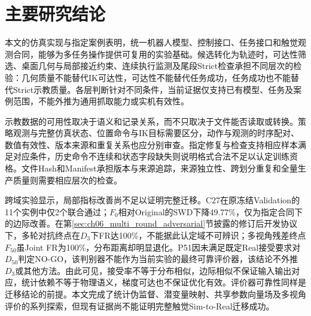 \section{主要研究结论}
\label{sec:ch07_main_research_conclusions}

本文的仿真实现与指定案例表明，统一机器人模型、控制接口、任务接口和触觉观测合同，能够为多任务操作提供可复用的实验基础。候选转化为轨迹时，可达性筛选、桌面几何与局部接近约束、连续执行监测及尾段Strict检查承担不同层次的检验：几何质量不能替代IK可达性，可达性不能替代任务成功，任务成功也不能替代Strict示教质量。各层判断针对不同条件，当前证据仅支持已有模型、任务及案例范围，不能外推为通用抓取能力或实机有效性。

示教数据的可用性取决于语义和记录关系，而不只取决于文件能否读取或转换。策略观测与完整仿真状态、位置命令与IK目标需要区分，动作与观测的时序配对、数值有效性、版本来源和重复关系也应分别审查。指定修复与检查支持相应样本满足对应条件，历史命令不连续和状态字段缺失则说明格式合法不足以认定训练资格。文件Hash和Manifest承担版本与来源追踪，来源独立性、跨划分重复和全量生产质量则需要相应层次的检查。

跨域实验显示，局部指标改善尚不足以证明完整迁移。C27在原冻结Validation的11个实例中仅2个联合通过；$F_0$相对Original的SWD下降49.77\%，仅为指定合同下的边际改善。在第\ref{sec:ch06_multi_round_adversarial}节披露的修订后开发协议下，多轮对抗终点在$D_3$下FR达100\%，不能据此认定域不可辨识；多视角残差终点$F_{50}$虽Joint FR为100\%，分布距离却明显退化。P51因未满足既定Real接受要求对$D_{50}$判定NO-GO，该判别器不能作为当前实验的最终可靠评价器，该结论不外推$D_3$或其他方法。由此可见，接受率不等于分布相似，边际相似不保证输入输出对应，统计依赖不等于物理语义，梯度可达也不保证优化有效。评价器可靠性同样是迁移结论的前提。本文完成了统计伪监督、潜变量映射、共享参数向量场及多视角评价的系列探索，但现有证据尚不能证明完整触觉Sim-to-Real迁移成功。
